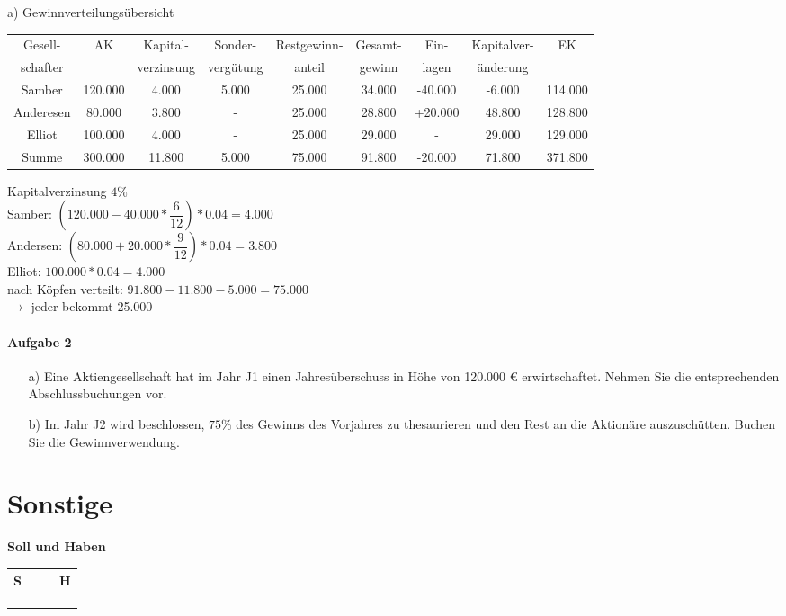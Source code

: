 \documentclass[paper=a4, fontsize=11pt]{scrartcl}
\numberwithin{equation}{section}
\numberwithin{figure}{section}
\numberwithin{table}{section}
\begin{document}
a) Gewinnverteilungsübersicht \\
\begin{tabular}{|c|c|c|c|c|c|c|c|c|}
\hline
Gesell- & AK & Kapital- & Sonder- & Restgewinn- & Gesamt- & Ein- & Kapitalver- & EK \\
schafter &  & verzinsung & vergütung & anteil & gewinn & lagen & änderung & \\\hline
Samber & 120.000 & 4.000 & 5.000 & 25.000 & 34.000 & -40.000 & -6.000 & 114.000 \\\hline
Anderesen & 80.000 & 3.800 & - & 25.000 & 28.800 & +20.000 & 48.800 & 128.800 \\\hline
Elliot & 100.000 & 4.000 & - & 25.000 & 29.000 & - & 29.000 & 129.000 \\\hline
Summe & 300.000 & 11.800 & 5.000 & 75.000 & 91.800 & -20.000 & 71.800 & 371.800 \\\hline
\end{tabular}

Kapitalverzinsung $4 \%$ \\
Samber: $(120.000-40.000 * \dfrac{6}{12}) *0.04 = 4.000$ \\
Andersen: $(80.000+20.000 * \dfrac{9}{12}) * 0.04 = 3.800$ \\
Elliot: $100.000 * 0.04 = 4.000$ \\

nach Köpfen verteilt: $91.800 - 11.800 - 5.000 = 75.000$ \\
$\rightarrow$ jeder bekommt 25.000
\paragraph{Aufgabe 2}
\begin{itemize}
\item[a)] Eine Aktiengesellschaft hat im Jahr J1 einen Jahresüberschuss in Höhe von 120.000 € erwirtschaftet. Nehmen Sie die entsprechenden Abschlussbuchungen vor. 
\item[b)] Im Jahr J2 wird beschlossen, $75 \%$ des Gewinns des Vorjahres zu thesaurieren und den Rest an die Aktionäre auszuschütten. Buchen Sie die Gewinnverwendung. 
\end{itemize}
\section{Sonstige}
\textbf{Soll und Haben}
\begin{tabular}{cc|cc}
S & & & H \\\hline
  & & & \\
  & & & \\\hline
  & & & \\\hline
\end{tabular}
\end{document}
